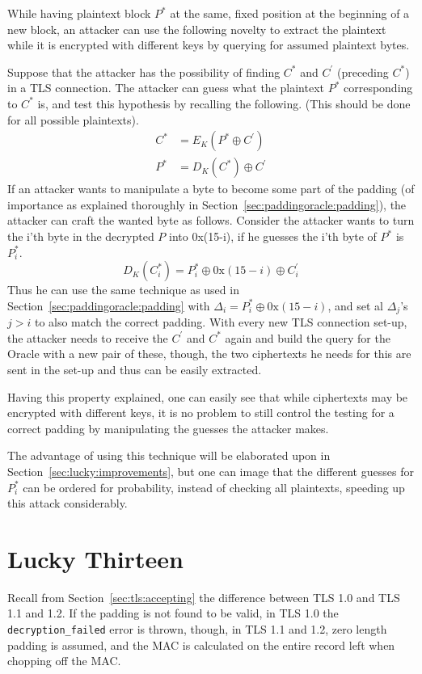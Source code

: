 \documentclass[10pt,conference,a4paper]{IEEEtran}
\begin{document}
While having plaintext block $P^{*}$ at the same, fixed position at the beginning of a new block, an attacker can use the following novelty to extract the plaintext while it is encrypted with different keys by querying for assumed plaintext bytes. 

Suppose that the attacker has the possibility of finding $C^{*}$ and $C^{'}$ (preceding $C^{*}$) in a TLS connection. The attacker can guess what the plaintext $P^{*}$ corresponding to $C^{*}$ is, and test this hypothesis by recalling the following. (This should be done for all possible plaintexts).
\[
\begin{split}
C^{*} &= E_K(P^{*} \oplus C^{'}) \\
P^{*} &= D_K(C^{*}) \oplus C^{'}
\end{split}
\]
If an attacker wants to manipulate a byte to become some part of the padding (of importance as explained thoroughly in Section~\ref{sec:paddingoracle:padding}), the attacker can craft the wanted byte as follows. Consider the attacker wants to turn the i'th byte in the decrypted $P$ into 0x(15-i), if he guesses the i'th byte of $P^{*}$ is $P_i^{*}$.
\[ D_K(C_i^{*}) = P_i^{*} \oplus 0\text{x}(15-i) \oplus C_i^{'} \]
Thus he can use the same technique as used in Section~\ref{sec:paddingoracle:padding} with $\Delta_i = P_i^{*} \oplus 0\text{x}(15-i)$, and set al $\Delta_j$'s $j>i$ to also match the correct padding. With every new TLS connection set-up, the attacker needs to receive the $C^{'}$ and $C^{*}$ again and build the query for the Oracle with a new pair of these, though, the two ciphertexts he needs for this are sent in the set-up and thus can be easily extracted.

Having this property explained, one can easily see that while ciphertexts may be encrypted with different keys, it is no problem to still control the testing for a correct padding by manipulating the guesses the attacker makes.

The advantage of using this technique will be elaborated upon in Section~\ref{sec:lucky:improvements}, but one can image that the different guesses for $P_i^{*}$ can be ordered for probability, instead of checking all plaintexts, speeding up this attack considerably.



\section{Lucky Thirteen}
\label{sec:lucky}
Recall from Section~\ref{sec:tls:accepting} the difference between TLS 1.0 and TLS 1.1 and 1.2. If the padding is not found to be valid, in TLS 1.0 the \texttt{decryption\_failed} error is thrown, though, in TLS 1.1 and 1.2, zero length padding is assumed, and the MAC is calculated on the entire record left when chopping off the MAC.
\end{document}
